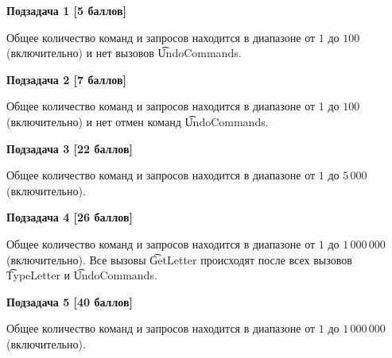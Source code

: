\bf{Подзадача 1 [5 баллов]}

Общее количество команд и запросов находится в диапазоне от $1$ до $100$ (включительно) и нет вызовов \t{UndoCommands}.

\bf{Подзадача 2 [7 баллов]}

Общее количество команд и запросов находится в диапазоне от $1$ до $100$ (включительно) и нет отмен команд \t{UndoCommands}.

\bf{Подзадача 3 [22 баллов]}

Общее количество команд и запросов находится в диапазоне от $1$ до $5\,000$ (включительно).

\bf{Подзадача 4 [26 баллов]}

Общее количество команд и запросов находится в диапазоне от $1$ до $1\,000\,000$ (включительно). Все вызовы \t{GetLetter} происходят после всех вызовов \t{TypeLetter} и \t{UndoCommands}.

\bf{Подзадача 5 [40 баллов]}

Общее количество команд и запросов находится в диапазоне от $1$ до $1\,000\,000$ (включительно).
